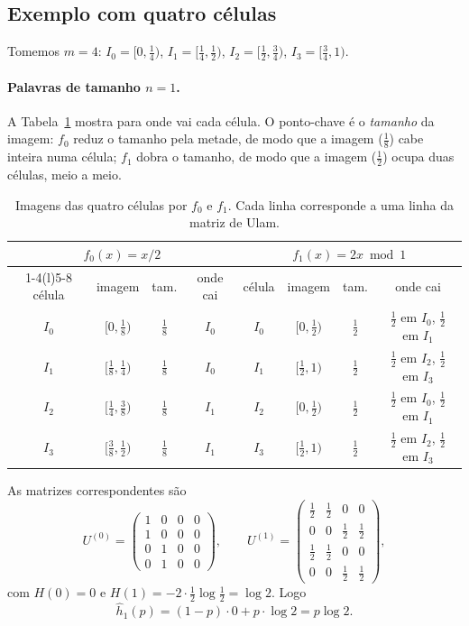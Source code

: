 \subsection{Exemplo com quatro células}
\label{subsec:pelikan-exemplo}

Tomemos $m=4$: $I_0=[0,\tfrac14)$, $I_1=[\tfrac14,\tfrac12)$, $I_2=[\tfrac12,\tfrac34)$,
$I_3=[\tfrac34,1)$.

\paragraph{Palavras de tamanho $n=1$.} A Tabela~\ref{tab:pelikan-n1} mostra para onde vai
cada célula. O ponto-chave é o \emph{tamanho} da imagem: $f_0$ reduz o tamanho pela metade, de
modo que a imagem ($\tfrac18$) cabe inteira numa célula; $f_1$ dobra o tamanho, de modo que a
imagem ($\tfrac12$) ocupa duas células, meio a meio.

\begin{table}[ht]
  \centering
  \small
  \begin{tabular}{cccc@{\qquad}cccc}
    \toprule
    \multicolumn{4}{c}{$f_0(x)=x/2$} & \multicolumn{4}{c}{$f_1(x)=2x\bmod 1$}\\
    \cmidrule(r){1-4}\cmidrule(l){5-8}
    célula & imagem & tam. & onde cai & célula & imagem & tam. & onde cai\\
    \midrule
    $I_0$ & $[0,\tfrac18)$ & $\tfrac18$ & $I_0$ &
    $I_0$ & $[0,\tfrac12)$ & $\tfrac12$ & $\tfrac12$ em $I_0$, $\tfrac12$ em $I_1$\\
    $I_1$ & $[\tfrac18,\tfrac14)$ & $\tfrac18$ & $I_0$ &
    $I_1$ & $[\tfrac12,1)$ & $\tfrac12$ & $\tfrac12$ em $I_2$, $\tfrac12$ em $I_3$\\
    $I_2$ & $[\tfrac14,\tfrac38)$ & $\tfrac18$ & $I_1$ &
    $I_2$ & $[0,\tfrac12)$ & $\tfrac12$ & $\tfrac12$ em $I_0$, $\tfrac12$ em $I_1$\\
    $I_3$ & $[\tfrac38,\tfrac12)$ & $\tfrac18$ & $I_1$ &
    $I_3$ & $[\tfrac12,1)$ & $\tfrac12$ & $\tfrac12$ em $I_2$, $\tfrac12$ em $I_3$\\
    \bottomrule
  \end{tabular}
  \caption{Imagens das quatro células por $f_0$ e $f_1$. Cada linha corresponde a uma linha da
  matriz de Ulam.}
  \label{tab:pelikan-n1}
\end{table}

As matrizes correspondentes são
\[
  U^{(0)}=\begin{pmatrix}1&0&0&0\\1&0&0&0\\0&1&0&0\\0&1&0&0\end{pmatrix},
  \qquad
  U^{(1)}=\begin{pmatrix}\tfrac12&\tfrac12&0&0\\0&0&\tfrac12&\tfrac12\\
  \tfrac12&\tfrac12&0&0\\0&0&\tfrac12&\tfrac12\end{pmatrix},
\]
com $H(0)=0$ e $H(1)=-2\cdot\tfrac12\log\tfrac12=\log2$. Logo
\[
  \hat h_1(p)=(1-p)\cdot 0+p\cdot\log2=p\log2 .
\]

